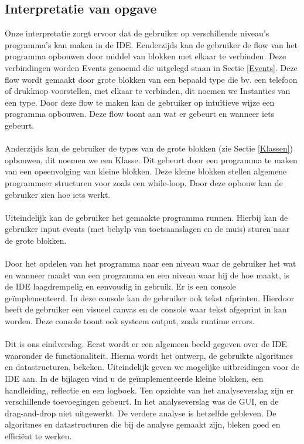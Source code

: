 \documentclass[]{article}
\begin{document}
\subsection{Interpretatie van opgave}
\label{interpretatie}
Onze interpretatie zorgt ervoor dat de gebruiker op verschillende niveau's programma's kan maken in de IDE. Eenderzijds kan de gebruiker de flow van het programma opbouwen door middel van blokken met elkaar te verbinden. Deze verbindingen worden Events genoemd die uitgelegd staan in Sectie \ref{Events}. Deze flow wordt gemaakt door grote blokken van een bepaald type die bv. een telefoon of drukknop voorstellen, met elkaar te verbinden, dit noemen we Instanties van een type. Door deze flow te maken kan de gebruiker op intu\"{i}tieve wijze een programma opbouwen. Deze flow toont aan wat er gebeurt en wanneer iets gebeurt. \\\\
Anderzijds kan de gebruiker de types van de grote blokken (zie Sectie \ref{Klassen}) opbouwen, dit noemen we een Klasse. Dit gebeurt door een programma te maken van een opeenvolging van kleine blokken. Deze kleine blokken stellen algemene programmeer structuren voor zoals een while-loop. Door deze opbouw kan de gebruiker zien hoe iets werkt. \\\\
Uiteindelijk kan de gebruiker het gemaakte programma runnen. Hierbij kan de gebruiker input events (met behylp van toetsaanslagen en de muis) sturen naar de grote blokken. \\\\ Door het opdelen van het programma naar een niveau waar de gebruiker het wat en wanneer maakt van een programma en een niveau waar hij de hoe maakt, is de IDE laagdrempelig en eenvoudig in gebruik. Er is een console ge\"{i}mplementeerd. In deze console kan de gebruiker ook tekst afprinten. Hierdoor heeft de gebruiker een visueel canvas en de console waar tekst afgeprint in kan worden. Deze console toont ook systeem output, zoals runtime errors.\\\\ 
Dit is ons eindverslag. Eerst wordt er een algemeen beeld gegeven over de IDE waaronder de functionaliteit. Hierna wordt het ontwerp, de gebruikte algoritmes en datastructuren, bekeken. Uiteindelijk geven we mogelijke uitbreidingen voor de IDE aan. In de bijlagen vind u de ge\"{i}mplementeerde kleine blokken, een handleiding, reflectie en een logboek. Ten opzichte van het analyseverslag zijn er verschillende toevoegingen gebeurt. In het analyseverslag was de GUI, en de drag-and-drop niet uitgewerkt. De verdere analyse is hetzelfde gebleven. De algoritmes en datastructuren die bij de analyse gemaakt zijn, bleken goed en effici\"ent te werken.
\end{document}
